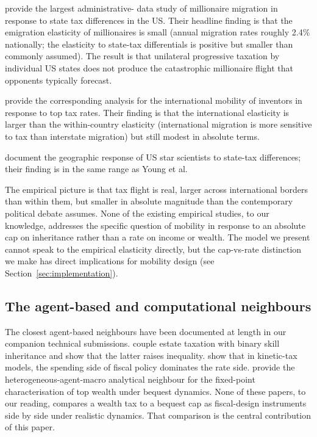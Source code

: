 \documentclass[11pt]{article}
\begin{document}
\citet{young2016millionaire} provide the largest administrative-
data study of millionaire migration in response to state tax
differences in the US.  Their headline finding is that the
emigration elasticity of millionaires is small (annual migration
rates roughly 2.4\% nationally; the elasticity to state-tax
differentials is positive but smaller than commonly assumed).  The
result is that unilateral progressive taxation by individual US
states does not produce the catastrophic millionaire flight that
opponents typically forecast.

\citet{akcigit2016inventors} provide the corresponding analysis for
the international mobility of inventors in response to top tax rates.
Their finding is that the international elasticity is larger than
the within-country elasticity (international migration is more
sensitive to tax than interstate migration) but still modest in
absolute terms.

\citet{moretti2017taxing} document the geographic response of US
star scientists to state-tax differences; their finding is in the
same range as Young et al.\

The empirical picture is that tax flight is real, larger across
international borders than within them, but smaller in absolute
magnitude than the contemporary political debate assumes.  None of
the existing empirical studies, to our knowledge, addresses the
specific question of mobility in response to an absolute cap on
inheritance rather than a rate on income or wealth.  The model we
present cannot speak to the empirical elasticity directly, but the
cap-vs-rate distinction we make has direct implications for
mobility design (see Section~\ref{sec:implementation}).

\subsection{The agent-based and computational neighbours}

The closest agent-based neighbours have been documented at length
in our companion technical submissions.  \citet{spangler2022distribution}
couple estate taxation with binary skill inheritance and show that
the latter raises inequality.  \citet{cardoso2025wealth} show that
in kinetic-tax models, the spending side of fiscal policy dominates
the rate side.  \citet{benhabib2011distribution} provide the
heterogeneous-agent-macro analytical neighbour for the
fixed-point characterisation of top wealth under bequest dynamics.
None of these papers, to our reading, compares a wealth tax to a
bequest cap as fiscal-design instruments side by side under
realistic dynamics.  That comparison is the central contribution
of this paper.
\end{document}
